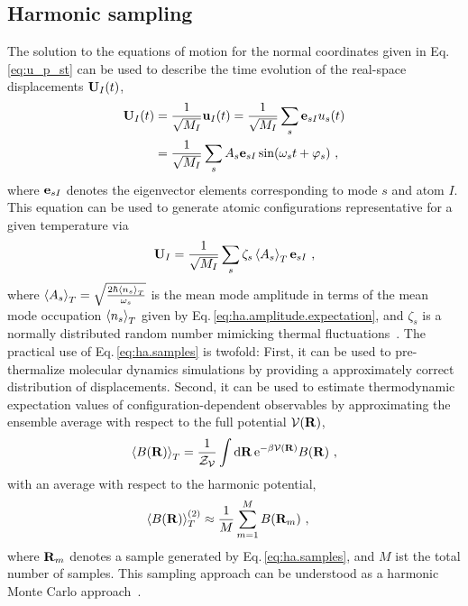 \subsection{Harmonic sampling}
The solution to the equations of motion for the normal coordinates given in Eq.\,\eqref{eq:u_p_st} can be used to describe the time evolution of the real-space displacements ${\bf U}_I (t)$,
\begin{align}
	{\bf U}_I (t) 
		&= \frac{1}{\sqrt{M_I}} {\bf u}_I (t) 
		= \frac{1}{\sqrt{M_I}} \sum_s {\bf e}_{sI} u_s (t) \\
		&= \frac{1}{\sqrt{M_I}} \sum_s  A_s {\bf e}_{sI} \sin (\omega_s t + \varphi_s)~,
\end{align}
where ${\bf e}_{sI}$ denotes the eigenvector elements corresponding to mode $s$ and atom $I$. This equation can be used to generate atomic configurations representative for a given temperature via
\begin{align}
	{\bf U}_I = \frac{1}{\sqrt{M_I}} \sum_s  \zeta_s \braket{A_s}_T \b e_{sI}~,
	\label{eq:ha.samples}
\end{align}
where $\braket{A_s}_T = \sqrt{\frac{2 \hbar \braket{n_s}_T}{\omega_s}}$ is the mean mode amplitude in terms of the mean mode occupation $\braket{n_s}_T$ given by Eq.\,\eqref{eq:ha.amplitude.expectation}, and $\zeta_s$ is a normally distributed random number mimicking thermal fluctuations~\cite{West2006}. The practical use of Eq.\,\eqref{eq:ha.samples} is twofold: First, it can be used to pre-thermalize molecular dynamics simulations by providing a approximately correct distribution of displacements. Second, it can be used to estimate thermodynamic expectation values of configuration-dependent observables by approximating the ensemble average with respect to the full potential $\mathcal V ({\bf R})$,
\begin{align}
	\braket{B ({\bf R})}_T
		= \frac{1}{\mathcal{Z}_{\mathcal{V}}} \int \d {\bf R} \,{\rm e}^{- \beta \mathcal V ({\bf R})} B({\bf R})~,
	\label{eq:ha.expectation.0}
\end{align}
with an average with respect to the harmonic potential,
\begin{align}
	\braket{B ({\bf R})}_T^{(2)}
		&\approx  \frac{1}{M} \sum\limits_{m=1}^{M} B({\bf R}_m)~,
\label{eq:ha.expectation.1}
\end{align}
where ${\bf R}_m$ denotes a sample generated by Eq.\,\eqref{eq:ha.samples}, and $M$ ist the total number of samples. This sampling approach can be understood as a harmonic Monte Carlo approach~\cite{West2006,Peslherbe1999}.

